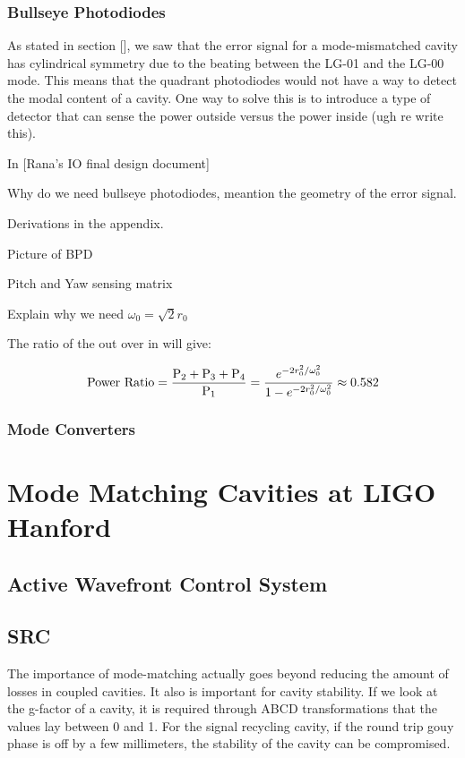 \documentclass[oneside]{book}
\begin{document}
		\subsection{Bullseye Photodiodes}
		As stated in section [], we saw that the error signal for a mode-mismatched cavity has cylindrical symmetry due to the beating between the LG-01 and the LG-00 mode.  This means that the quadrant photodiodes would not have a way to detect the modal content of a cavity.  One way to solve this is to introduce a type of detector that can sense the power outside versus the power inside (ugh re write this).
		
		In [Rana's IO final design document] 
		
		
		Why do we need bullseye photodiodes, meantion the geometry of the error signal.
		
		Derivations in the appendix.
		
		Picture of BPD
		
		Pitch and Yaw sensing matrix
		
		Explain why we need $\omega_{0} = \sqrt{2} r_0$
		
		The ratio of the out over in will give:
		
		\begin{equation}
		\text{Power Ratio} = \frac{\text{P}_2 + \text{P}_3 + \text{P}_4}{\text{P}_1}  \\
		= \frac{e^{-2r_0^2/ \omega_{0}^2}} {1 - e^{-2r_0^2/ \omega_{0}^2 }} \approx 0.582
		\end{equation}
		
		\subsection{Mode Converters}
		
		
		

\chapter{Mode Matching Cavities at LIGO Hanford}

	\section{Active Wavefront Control System}
	
	\section{SRC}
	The importance of mode-matching actually goes beyond reducing the amount of losses in coupled cavities.  It also is important for cavity stability.  If we look at the g-factor of a cavity, it is required through ABCD transformations that the values lay between 0 and 1.  For the signal recycling cavity, if the round trip gouy phase is off by a few millimeters, the stability of the cavity can be compromised. 
	
\end{document}
